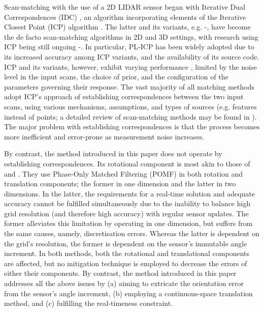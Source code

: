 Scan-matching with the use of a 2D LIDAR sensor began with Iterative Dual
Correspondences (IDC) \cite{LuMilios},
an algorithm incorporating elements of the Iterative Closest Point (ICP)
algorithm \cite{ICP}. The latter and its variants, e.g.
\cite{weighted}-\cite{fgicp}, have become the de facto scan-matching algorithms
in 2D and 3D settings, with research using ICP being still ongoing
\cite{ICP_var_1}-\cite{vgicp}. In particular, PL-ICP \cite{plicp} has been
widely adopted due to its increased accuracy among ICP variants, and the
availability of its source code. ICP and its variants, however, exhibit varying
performance \cite{icp_comp_trade}, limited by the noise level in the input
scans, the choice of prior, and the configuration of the parameters
governing their response. The vast majority of all matching methods adopt ICP's
approach of establishing correspondences between the two input scans, using
various mechanisms, assumptions, and types of sources (e.g. features instead
of points; a detailed review of scan-matching methods may be found in
\cite{pose_selection}). The major problem with establishing correspondences is
that the process becomes more inefficient and error-prone as measurement noise
increases.

By contrast, the method introduced in this paper does not operate by
establishing correspondences. Its rotational component is most akin to those of
\cite{Heng} and \cite{Jiang}. They use Phase-Only Matched Filtering (POMF)
\cite{fmt2d} in both rotation and translation components; the former in one
dimension and the latter in two dimensions. In the latter, the requirements for
a real-time solution and adequate accuracy cannot be fulfilled simultaneously
due to the inability to balance high grid resolution (and therefore high
accuracy) with regular sensor updates. The former alleviates this limitation by
operating in one dimension, but suffers from the same causes, namely,
discretisation errors. Whereas the latter is dependent on the grid's
resolution, the former is dependent on the sensor's immutable angle increment.
In both methods, both the rotational and translational components are affected,
but no mitigation technique is employed to decrease the errors of either their
components. By contrast, the method introduced in this paper addresses all the
above issues by (a) aiming to extricate the orientation error from the
sensor's angle increment, (b) employing a continuous-space translation method,
and (c) fulfilling the real-timeness constraint.
